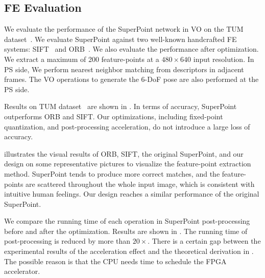 \subsection{ FE Evaluation }

We evaluate the performance of the SuperPoint network in VO on the TUM dataset~\cite{sturm12iros}. We evaluate SuperPoint against two well-known handcrafted FE systems: SIFT~\cite{Lowe-478} and ORB~\cite{Mur-Artal:2017281}. 
We also evaluate the performance after optimization. 
We extract a maximum of 200 feature-points at a $480\times640$ input resolution. 
In PS side, We perform nearest neighbor matching from descriptors in adjacent frames. The VO operations to generate the 6-DoF pose are also performed at the PS side.

Results on TUM dataset~\cite{sturm12iros} are shown in . In terms of accuracy, SuperPoint outperforms ORB and SIFT. Our optimizations, including fixed-point quantization, and post-processing acceleration, do not introduce a large loss of accuracy. 

 illustrates the visual results of ORB, SIFT, the original SuperPoint, and our design on some representative pictures to visualize the feature-point extraction method. 
SuperPoint tends to produce more correct matches, and the feature-points are scattered throughout the whole input image, which is consistent with intuitive human feelings. 
Our design reaches a similar performance of the original SuperPoint. 





We compare the running time of each operation in SuperPoint post-processing before and after the optimization. Results are shown in . The running time of post-processing is reduced by more than $20\times$. There is a certain gap between the experimental results of the acceleration effect and the theoretical derivation in . The possible reason is that the CPU needs time to schedule the FPGA accelerator.


